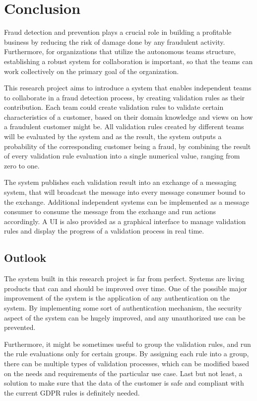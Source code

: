 \chapter{Conclusion}

  Fraud detection and prevention plays a crucial role in building a profitable business by reducing the risk of damage done by any fraudulent activity. Furthermore, for organizations that utilize the autonomous teams structure, establishing a robust system for collaboration is important, so that the teams can work collectively on the primary goal of the organization.

  This research project aims to introduce a system that enables independent teams to collaborate in a fraud detection process, by creating validation rules as their contribution. Each team could create validation rules to validate certain characteristics of a customer, based on their domain knowledge and views on how a fraudulent customer might be. All validation rules created by different teams will be evaluated by the system and as the result, the system outputs a probability of the corresponding customer being a fraud, by combining the result of every validation rule evaluation into a single numerical value, ranging from zero to one. 
  
  The system publishes each validation result into an exchange of a messaging system, that will broadcast the message into every message consumer bound to the exchange. Additional independent systems can be implemented as a message consumer to consume the message from the exchange and run actions accordingly. A UI is also provided as a  graphical interface to manage validation rules and display the progress of a validation process in real time. 
  
  \section{Outlook}

    The system built in this research project is far from perfect. Systems are living products that can and should be improved over time. One of the possible major improvement of the system is the application of any authentication on the system. By implementing some sort of authentication mechanism, the security aspect of the system can be hugely improved, and any unauthorized use can be prevented. 

    Furthermore, it might be sometimes useful to group the validation rules, and run the rule evaluations only for certain groups. By assigning each rule into a group, there can be multiple types of validation processes, which can be modified based on the needs and requirements of the particular use case. Last but not least, a solution to make sure that the data of the customer is safe and compliant with the current GDPR rules is definitely needed. 